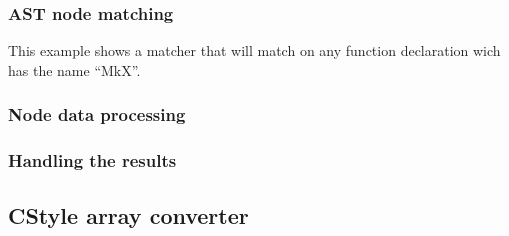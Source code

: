\subsubsection*{AST node matching}

\begin{listing}[H]
    \begin{cppcode}

    \end{cppcode}
    \caption{This example shows a matcher that will match on any function declaration wich has the name ``MkX''.}
    \label{code:080dev:match_functionDecl_with_name}
\end{listing}

\subsubsection*{Node data processing}
\subsubsection*{Handling the results}


\subsection{CStyle array converter}